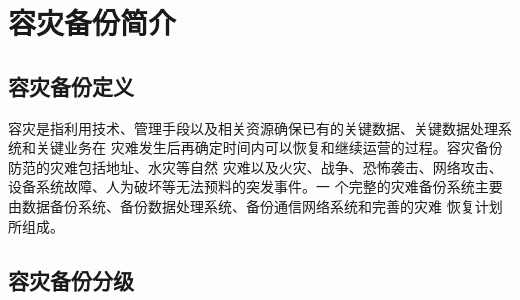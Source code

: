 \documentclass[cyan]{elegantnote}
\author{崔炜皞}
\begin{document}
\maketitle
\tableofcontents
\chapter{容灾备份简介}

\section{容灾备份定义}

容灾是指利用技术、管理手段以及相关资源确保已有的关键数据、关键数据处理系统和关键业务在
灾难发生后再确定时间内可以恢复和继续运营的过程。容灾备份防范的灾难包括地址、水灾等自然
灾难以及火灾、战争、恐怖袭击、网络攻击、设备系统故障、人为破坏等无法预料的突发事件。一
个完整的灾难备份系统主要由数据备份系统、备份数据处理系统、备份通信网络系统和完善的灾难
恢复计划所组成。

\section{容灾备份分级}
\end{document}
